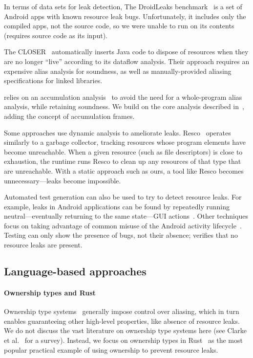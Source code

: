In terms of data sets for leak detection, The DroidLeaks
benchmark~\cite{liu2019droidleaks} is a set of Android apps with known resource
leak bugs. Unfortunately, it includes only the compiled apps, not the source
code, so we were unable to run \Tool on its contents (\Tool requires source code
as its input).

The CLOSER~\cite{dillig2008closer} automatically inserts Java code to dispose of
resources when they are no longer ``live'' according to its dataflow analysis.
Their approach requires an expensive alias analysis for soundness, as well as
manually-provided aliasing specifications for linked libraries.

\Tool relies on an accumulation
analysis~\cite{KelloggRSSE2020,FahndrichLeino03} to avoid the need
for a whole-program alias analysis, while retaining soundness.  We
build on the core analysis described in~\cite{KelloggRSSE2020},
adding the concept of accumulation frames.


Some approaches use dynamic analysis to ameliorate leaks.  Resco~\cite{dai2013resco}
operates similarly to a garbage collector, tracking resources whose program
elements have become unreachable. When a given resource (such as file
descriptors) is close to exhaustion, the runtime runs Resco to clean up any
resources of that type that are unreachable.  With a static approach such as
ours, a tool like Resco becomes unnecessary---leaks become impossible.

Automated test generation can also be used to try to detect resource
leaks. For example, leaks in Android applications can be found by
repeatedly running neutral---eventually returning to the same
state---GUI actions~\cite{wu2018sentinel,zhang2016automated}.
Other techniques focus on taking advantage of common misuse of
the Android activity lifecycle~\cite{amalfitano2020memories}.
Testing can only show the presence of bugs, not their absence;
\Tool verifies that no resource leaks are present.

\subsection{Language-based approaches}\label{sec:rw-language}

\paragraph{Ownership types and Rust} Ownership type
systems~\cite{clarke2013ownership} generally impose control over aliasing, which
in turn enables guaranteeing other high-level properties, like absence of
resource leaks.  We do not discuss the vast literature on ownership type systems
here (see Clarke et al.~\cite{clarke2013ownership} for a survey). Instead, we
focus on ownership types in Rust~\cite{klabnik2018rust} as the most popular
practical example of using ownership to prevent resource leaks.

